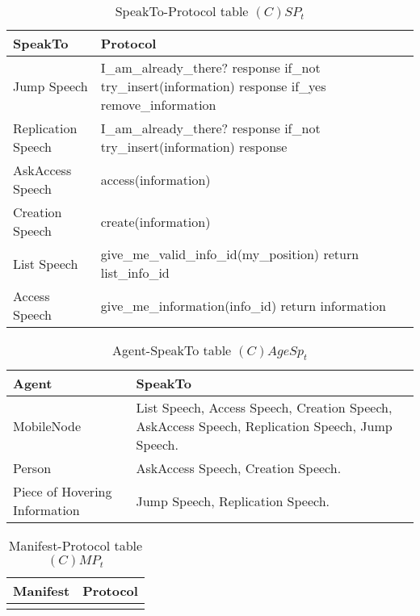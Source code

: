\begin{table}[H]
	\centering
	\begin{tabular}{|p{4cm}|p{8cm}|}
			\hline
			\textbf{SpeakTo} & \textbf{Protocol} \\
			\hline
			Jump Speech & I\_am\_already\_there? \newline response \newline if\_not
			try\_insert(information) \newline response \newline if\_yes remove\_information \\
			\hline
			Replication Speech & I\_am\_already\_there? \newline response \newline if\_not
			try\_insert(information) \newline response \\
			\hline
			AskAccess Speech & access(information) \\
			\hline
			Creation Speech & create(information) \\
			\hline
			List Speech & give\_me\_valid\_info\_id(my\_position) \newline return list\_info\_id\\
			\hline
			Access Speech & give\_me\_information(info\_id) \newline return information \\
			\hline
		\end{tabular}
	\caption{SpeakTo-Protocol table $(C)SP_t$}
	\label{tab:cspt}
\end{table}

\begin{table}[H]
	\centering
	\begin{tabular}{|p{4cm}|p{8cm}|}
			\hline
			\textbf{Agent} & \textbf{SpeakTo} \\
			\hline
			MobileNode & List Speech, Access Speech, Creation Speech, AskAccess Speech, Replication Speech, Jump Speech. \\
			\hline
			Person & AskAccess Speech, Creation Speech. \\
			\hline
			Piece of Hovering Information & Jump Speech, Replication Speech. \\
			\hline
		\end{tabular}
	\caption{Agent-SpeakTo table $(C)AgeSp_t$}
	\label{tab:cagespt}
\end{table}

\begin{table}[H]
	\centering
	\begin{tabular}{|p{4cm}|p{8cm}|}
			\hline
			\textbf{Manifest} & \textbf{Protocol} \\
			\hline
			& \\
			\hline
		\end{tabular}
	\caption{Manifest-Protocol table $(C)MP_t$}
	\label{tab:cmpt}
\end{table}

